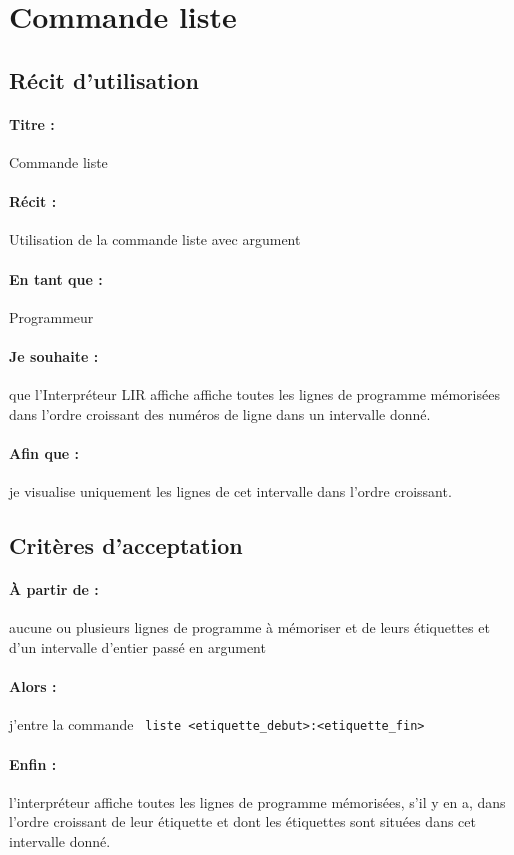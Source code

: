 \section{Commande liste}

    \subsection*{Récit d'utilisation}

    \paragraph{Titre : } Commande liste
    \paragraph{Récit : } Utilisation de la commande liste avec argument
    \paragraph{En tant que : } Programmeur
    \paragraph{Je souhaite : } que l'Interpréteur LIR affiche affiche
    toutes les lignes de programme mémorisées dans l'ordre
    croissant des numéros de ligne dans un intervalle donné.
    \paragraph{Afin que : } je visualise uniquement les lignes de cet intervalle dans l'ordre croissant.

    \subsection*{Critères d'acceptation}

    \paragraph{À partir de : } aucune ou plusieurs lignes de programme
    à mémoriser et de leurs étiquettes et d'un intervalle d'entier passé en argument

    \paragraph{Alors : } j'entre la commande \verb| liste <etiquette_debut>:<etiquette_fin> |

    \paragraph{Enfin : } l'interpréteur affiche toutes les lignes
    de programme mémorisées, s'il y en a, dans l'ordre croissant de leur
    étiquette et dont les étiquettes sont situées dans cet intervalle donné.